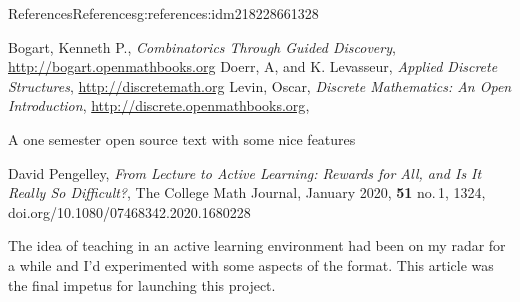 \documentclass[oneside,10pt,]{book}
\newcommand{\xreffont}{\relax}
\numberwithin{equation}{section}
\begin{document}
\begin{references-chapter-numberless}{References}{}{References}{}{}{g:references:idm218228661328}
%
\begin{referencelist}
\hypertarget{x:biblio:biblio-bogart-2017}{}Bogart, Kenneth P., \textit{Combinatorics Through Guided Discovery}, \href{http://bogart.openmathbooks.org}{http:\slash{}\slash{}bogart.openmathbooks.org}
\hypertarget{x:biblio:biblio-doerr-2019}{}Doerr, A, and K. Levasseur, \textit{Applied Discrete Structures}, \href{http://discretemath.org}{http:\slash{}\slash{}discretemath.org}
\hypertarget{x:biblio:biblio-levin-2020}{}Levin, Oscar, \textit{Discrete Mathematics: An Open Introduction}, \href{http://discrete.openmathbooks.org}{http:\slash{}\slash{}discrete.openmathbooks.org}, \par%
A one semester open source text with some nice features%

\hypertarget{x:biblio:biblio-pengelley}{}David Pengelley, \textit{From Lecture to Active Learning: Rewards for All, and Is It Really So Difficult?}, The College Math Journal, January 2020, \textbf{51} no.\@\,1, 13\textendash{}24, doi.org\slash{}10.1080\slash{}07468342.2020.1680228\par%
The idea of teaching in an active learning environment had been on my radar for a while and I'd experimented with some aspects of the format. This article was the final impetus for launching this project.%

\end{referencelist}
\end{references-chapter-numberless}
%
{\xreffont\printindex}
%
\end{document}
